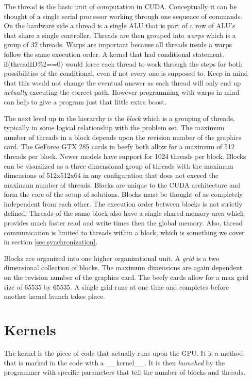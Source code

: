 \documentclass{article}
\newcommand{\comp}[1]{{\ttfamily #1}}
\begin{document}
    The thread is the basic unit of computation in CUDA. Conceptually it can be thought of a single serial processor working through one sequence of commands. On the hardware side a thread is a single ALU that is part of a row of ALU's that share a single controller. Threads are then grouped into \emph{warps} which is a group of 32 threads. Warps are important because all threads inside a warps follow the same execution order. A kernel that had conditional statement, \comp{if(threadID\%2==0)} would force each thread to work through the steps for both possibilities of the conditional, even if not every one is supposed to. Keep in mind that this would not change the eventual answer as each thread will only end up \emph{actually} executing the correct path. However programming with warps in mind can help to give a program just that little extra boost.

    The next level up in the hierarchy is the \emph{block} which is a grouping of threads, typically in some logical relationship with the problem set. The maximum number of threads in a block depends upon the revision number of the graphics card. The GeForce GTX 285 cards in beefy both allow for a maximum of 512 threads per block. Newer models have support for 1024 threads per block. Blocks can be visualized as a three dimensional group of threads with the maximum dimensions of 512x512x64 in any configuration that does not exceed the maximum number of threads. Blocks are unique to the CUDA architecture and form the core of the setup of solutions. Blocks must be thought of as completely independent from each other. The execution order between blocks is not strictly defined. Threads of the same block also have a single shared memory area which provides much faster read and write times then the global memory. Also, thread communication is limited to threads within a block, which is something we cover in section \ref{sec.synchronization}.

    Blocks are organized into one higher organizational unit. A \emph{grid} is a two dimensional collection of blocks. The maximum dimensions are again dependent on the revision number of the graphics card. The beefy cards allow for a max grid size of 65535 by 65535. A single grid runs at one time and completes before another kernel launch takes place.
	
	\section{Kernels}
    The kernel is the piece of code that actually runs upon the GPU. It is a method that is marked in the code with a \comp{\_\_kernel\_\_}. It is then \emph{launched} by the programmer with specific parameters that tell the number of blocks and threads.
\end{document}

